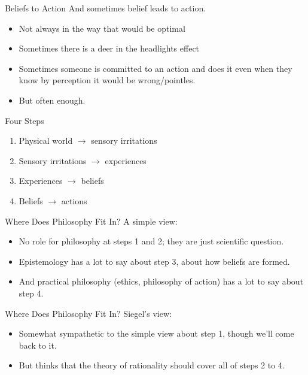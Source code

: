 \documentclass[
  17pt,
  letterpaper,
  ignorenonframetext,
  aspectratio=169,
]{beamer}
\providecommand{\tightlist}{%
  \setlength{\itemsep}{0pt}\setlength{\parskip}{0pt}}\usepackage{longtable,booktabs,array}
\begin{document}
\begin{frame}{Beliefs to Action}
\protect\hypertarget{beliefs-to-action}{}
And sometimes belief leads to action.

\begin{itemize}[<+->]
\tightlist
\item
  Not always in the way that would be optimal
\item
  Sometimes there is a deer in the headlights effect
\item
  Sometimes someone is committed to an action and does it even when they
  know by perception it would be wrong/pointles.
\item
  But often enough.
\end{itemize}
\end{frame}

\begin{frame}{Four Steps}
\protect\hypertarget{four-steps-1}{}
\begin{enumerate}[<+->]
\tightlist
\item
  Physical world \(\rightarrow\) sensory irritations
\item
  Sensory irritations \(\rightarrow\) experiences
\item
  Experiences \(\rightarrow\) beliefs
\item
  Beliefs \(\rightarrow\) actions
\end{enumerate}
\end{frame}

\begin{frame}{Where Does Philosophy Fit In?}
\protect\hypertarget{where-does-philosophy-fit-in}{}
A simple view:

\begin{itemize}[<+->]
\tightlist
\item
  No role for philosophy at steps 1 and 2; they are just scientific
  question.
\item
  Epistemology has a lot to say about step 3, about how beliefs are
  formed.
\item
  And practical philosophy (ethics, philosophy of action) has a lot to
  say about step 4.
\end{itemize}
\end{frame}

\begin{frame}{Where Does Philosophy Fit In?}
\protect\hypertarget{where-does-philosophy-fit-in-1}{}
Siegel's view:

\begin{itemize}[<+->]
\tightlist
\item
  Somewhat sympathetic to the simple view about step 1, though we'll
  come back to it.
\item
  But thinks that the theory of rationality should cover all of steps 2
  to 4.
\end{itemize}
\end{frame}
\end{document}
